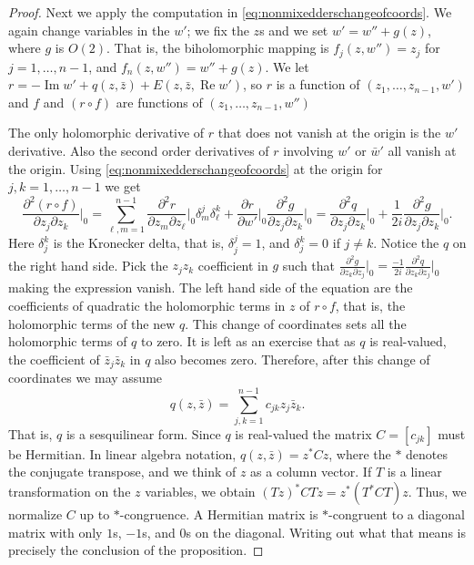\documentclass[12pt,openany]{book}
\renewcommand{\Re}{\operatorname{Re}}
\renewcommand{\Im}{\operatorname{Im}}
\theoremstyle{plain}
\theoremstyle{remark}
\theoremstyle{definition}
\theoremstyle{exercise}
\theoremstyle{example}
\begin{document}
\begin{proof}
Next we 
apply the computation in \eqref{eq:nonmixedderschangeofcoords}.
We again change variables in the $w'$; we fix the $z$s and we set
$w' = w'' + g(z)$, where $g$ is $O(2)$.  
That is, the biholomorphic mapping is
$f_j(z,w'') = z_j$ for $j=1,\ldots,n-1$, and $f_n(z,w'') = w'' +g(z)$.
We let $r = - \Im w' + q(z,\bar{z}) + E(z,\bar{z},\Re w')$, so
$r$ is a function of $(z_1,\ldots,z_{n-1},w')$ and
$f$ and $(r \circ f)$ are functions of $(z_1,\ldots,z_{n-1},w'')$

The only
holomorphic derivative of $r$ that does not vanish at the origin is the $w'$
derivative.  Also the second order derivatives of $r$ involving $w'$ or
$\bar{w}'$ all vanish at the origin.
Using
\eqref{eq:nonmixedderschangeofcoords} at the origin for
$j,k=1,\ldots,n-1$ we get
\begin{equation*}
\frac{\partial^2 (r \circ f)}{\partial z_j \partial z_k}
\Big|_0 = 
\sum_{\ell,m=1}^{n-1} \frac{\partial^2 r}{\partial z_m \partial z_\ell}
\Big|_0
\delta_{m}^j \delta_{\ell}^k
+
\frac{\partial r}{\partial w'} \Big|_0
\frac{\partial^2 g}{\partial z_j \partial z_k} \Big|_0
=
\frac{\partial^2 q}{\partial z_j \partial z_k} \Big|_0
+
\frac{1}{2i} 
\frac{\partial^2 g}{\partial z_j \partial z_k} \Big|_0 .
\end{equation*}
Here $\delta_{j}^k$ is the Kronecker delta, that is, $\delta_j^j = 1$,
and $\delta_j^k = 0$ if $j \not= k$.  Notice the $q$ on the right hand
side.
Pick the $z_j z_k$ coefficient in $g$
such that $\frac{\partial^2 g}{\partial z_k \partial z_j} \big|_0 =
\frac{-1}{2i} \frac{\partial^2 q}{\partial z_k \partial z_j} \big|_0$
making the expression vanish.
The left hand side of the equation are the coefficients of
quadratic the holomorphic terms in $z$ of $r \circ f$, that is, the
holomorphic terms of the new $q$.
This change of coordinates
sets all the holomorphic terms of $q$ to zero.
It is left as an exercise that as $q$ is real-valued,
the coefficient of $\bar{z}_j \bar{z}_k$ in $q$ also becomes zero.
Therefore, after this change of coordinates we may assume
\begin{equation*}
q(z,\bar{z}) = \sum_{j,k=1}^{n-1} c_{jk} z_j \bar{z}_k .
\end{equation*}
That is, $q$ is a sesquilinear form.  Since $q$ is real-valued the matrix
$C = [ c_{jk} ]$ must be Hermitian.  In linear algebra notation,
$q(z,\bar{z}) = z^*Cz$,
where the $*$ denotes the conjugate transpose,
and we think of $z$ as a column vector.
If $T$ is a linear transformation on the $z$ variables, we
obtain ${(Tz)}^*CTz = z^* ( T^*CT) z$.  Thus, we normalize $C$
up to $*$-congruence.  A Hermitian matrix
is $*$-congruent to a diagonal matrix with only $1$s, $-1$s, and $0$s on the
diagonal.  Writing out what that means is precisely the conclusion of the
proposition.
\end{proof}
\end{document}
